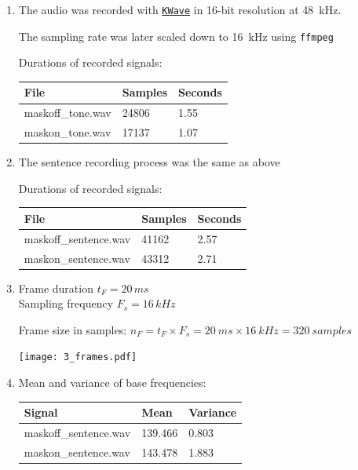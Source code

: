 \documentclass[a4paper, 11pt]{article}
\begin{document}
	\begin{enumerate}
		\item
		The audio was recorded with \texttt{\href{https://apps.kde.org/en/kwave}{KWave}} in 16-bit resolution at 48~kHz.

		The sampling rate was later scaled down to 16~kHz using \texttt{ffmpeg}

		Durations of recorded signals: \\
		\begin{tabular}{ | l | l | l | }
			\hline
			\textbf{File} & \textbf{Samples} & \textbf{Seconds} \\ \hline
			maskoff\_tone.wav & 24806            & 1.55             \\ \hline
			maskon\_tone.wav  & 17137            & 1.07             \\ \hline
		\end{tabular}

		\item
		The sentence recording process was the same as above

		Durations of recorded signals: \\
		\begin{tabular}{ | l | l | l | }
			\hline
			\textbf{File}     & \textbf{Samples} & \textbf{Seconds} \\ \hline
			maskoff\_sentence.wav & 41162            & 2.57             \\ \hline
			maskon\_sentence.wav  & 43312            & 2.71             \\ \hline
		\end{tabular}

		\item
		Frame duration $t_F = 20\,ms$ \\
		Sampling frequency $F_s = 16\,kHz$

		Frame size in samples: $n_F = t_F \times F_s = 20~ms \times 16~kHz = 320~samples$

		\texttt{[image: 3\_frames.pdf]}

		\item
		Mean and variance of base frequencies: \\
		\begin{tabular}{ | l | l | l | }
			\hline
			\textbf{Signal}    & \textbf{Mean} & \textbf{Variance} \\ \hline
			maskoff\_sentence.wav & 139.466       & 0.803             \\ \hline
			maskon\_sentence.wav  & 143.478       & 1.883             \\ \hline
		\end{tabular}


\end{enumerate}
\end{document}
